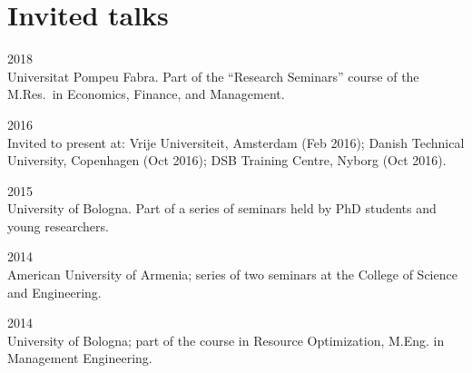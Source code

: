 \section*{Invited talks}

\begin{paracol}{2}
  \textsc{2018}
\switchcolumn
  \\
  Universitat Pompeu Fabra. Part of the ``Research Seminars'' course of the M.Res.\ in Economics, Finance, and Management.
\end{paracol}

\begin{paracol}{2}
  \textsc{2016}
\switchcolumn
  \\
  Invited to present at: Vrije Universiteit, Amsterdam (Feb 2016); Danish Technical University, Copenhagen (Oct 2016); DSB Training Centre, Nyborg (Oct 2016).
\end{paracol}

\begin{paracol}{2}
  \textsc{2015}
\switchcolumn
  \\
  University of Bologna. Part of a series of seminars held by PhD students and young researchers.
\end{paracol}

\begin{paracol}{2}
  \textsc{2014}
\switchcolumn
  \\
  American University of Armenia; series of two seminars at the College of Science and Engineering.
\end{paracol}

\begin{paracol}{2}
  \textsc{2014}
\switchcolumn
  \\
  University of Bologna; part of the course in Resource Optimization, M.Eng. in Management Engineering.
\end{paracol}
